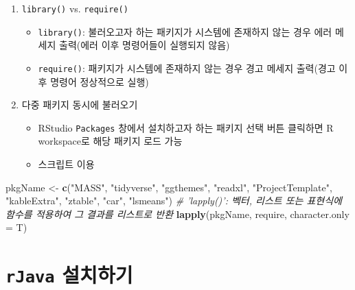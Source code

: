 \documentclass[11pt,a4paper]{book}
\newenvironment{Shaded}{\begin{snugshade}}{\end{snugshade}}
\newcommand{\KeywordTok}[1]{\textcolor[rgb]{0.13,0.29,0.53}{\textbf{#1}}}
\newcommand{\DataTypeTok}[1]{\textcolor[rgb]{0.13,0.29,0.53}{#1}}
\newcommand{\StringTok}[1]{\textcolor[rgb]{0.31,0.60,0.02}{#1}}
\newcommand{\CommentTok}[1]{\textcolor[rgb]{0.56,0.35,0.01}{\textit{#1}}}
\newcommand{\NormalTok}[1]{#1}
\providecommand{\tightlist}{%
  \setlength{\itemsep}{0pt}\setlength{\parskip}{0pt}}
\theoremstyle{definition}
\theoremstyle{definition}
\theoremstyle{definition}
\theoremstyle{remark}
\begin{document}
\begin{enumerate}
\def\labelenumi{\arabic{enumi}.}
\tightlist
\item
  \texttt{library()} vs. \texttt{require()}

  \begin{itemize}
  \tightlist
  \item
    \texttt{library()}: 불러오고자 하는 패키지가 시스템에 존재하지 않는
    경우 에러 메세지 출력(에러 이후 명령어들이 실행되지 않음)
  \item
    \texttt{require()}: 패키지가 시스템에 존재하지 않는 경우 경고 메세지
    출력(경고 이후 명령어 정상적으로 실행)
  \end{itemize}
\item
  다중 패키지 동시에 불러오기

  \begin{itemize}
  \tightlist
  \item
    RStudio \texttt{Packages} 창에서 설치하고자 하는 패키지 선택 버튼
    클릭하면 R workspace로 해당 패키지 로드 가능
  \item
    스크립트 이용
  \end{itemize}
\end{enumerate}

\footnotesize

\begin{Shaded}
\begin{Highlighting}[]
\NormalTok{pkgName <-}\StringTok{ }\KeywordTok{c}\NormalTok{(}\StringTok{"MASS"}\NormalTok{, }\StringTok{"tidyverse"}\NormalTok{, }\StringTok{"ggthemes"}\NormalTok{, }\StringTok{"readxl"}\NormalTok{, }\StringTok{"ProjectTemplate"}\NormalTok{, }\StringTok{"kableExtra"}\NormalTok{, }
    \StringTok{"ztable"}\NormalTok{, }\StringTok{"car"}\NormalTok{, }\StringTok{"lsmeans"}\NormalTok{)}
\CommentTok{# 'lapply()': 벡터, 리스트 또는 표현식에 함수를 적용하여 그 결과를 리스트로 반환}
\KeywordTok{lapply}\NormalTok{(pkgName, require, }\DataTypeTok{character.only =}\NormalTok{ T)}
\end{Highlighting}
\end{Shaded}

\normalsize

\section{\texorpdfstring{\texttt{rJava}
설치하기}{rJava 설치하기}}\label{rjava-}
\end{document}

